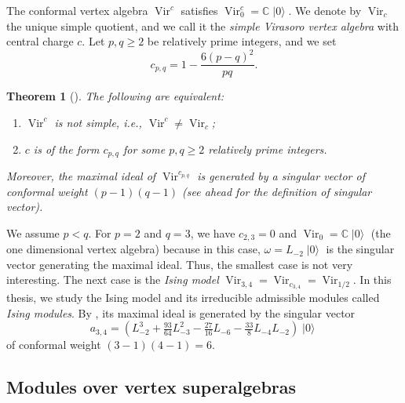 \documentclass[a4paper, 12pt, reqno]{amsart}
\newtheorem{theorem}{Theorem}[section]
\theoremstyle{remark}
\numberwithin{equation}{subsection}
\DeclareMathOperator{\Vir}{Vir}
\DeclareMathOperator{\vac}{|0\rangle}
\begin{document}
The conformal vertex algebra $\Vir^c$ satisfies $\Vir^c_0 = \mathbb{C}\vac$.
We denote by $\Vir_c$ the unique simple quotient, and we call it the \emph{simple Virasoro vertex algebra} with central charge $c$.
Let $p, q \ge 2$ be relatively prime integers, and we set
\begin{equation*}
  c_{p, q} = 1 - \frac{6(p - q)^2}{pq}.
\end{equation*}

\begin{theorem}[{\cite{gorelik_simplicity_2007}}]
  \label{thr:23}
  The following are equivalent:
  \begin{enumerate}
  \item $\Vir^c$ is not simple, i.e., $\Vir^c \neq \Vir_c$;
  \item $c$ is of the form $c_{p, q}$ for some $p, q \ge 2$ relatively prime integers.
  \end{enumerate}
  Moreover, the maximal ideal of $\Vir^{c_{p, q}}$ is generated by a singular vector of conformal weight $(p - 1)(q - 1)$ (see  ahead for the definition of singular vector).
\end{theorem}

We assume $p < q$.
For $p = 2$ and $q = 3$, we have $c_{2, 3} = 0$ and $\Vir_0 = \mathbb{C}\vac$ (the one dimensional vertex algebra) because in this case, $\omega = L_{-2}\vac$ is the singular vector generating the maximal ideal.
Thus, the smallest case is not very interesting.
The next case is the \emph{Ising model} $\Vir_{3, 4} = \Vir_{c_{3, 4}} = \Vir_{1/2}$.
In this thesis, we study the Ising model and its irreducible admissible modules called \emph{Ising modules}.
By , its maximal ideal is generated by the singular vector
\begin{equation}
  \label{eq:20}
  a_{3, 4} = (L_{-2}^3 + \tfrac{93}{64}L_{-3}^2 - \tfrac{27}{16}L_{-6} - \tfrac{33}{8}L_{-4}L_{-2})\vac
\end{equation}
of conformal weight $(3 - 1)(4 - 1) = 6$.

\subsection{Modules over vertex superalgebras}
\label{sec:modules-over-vertex}
\end{document}

